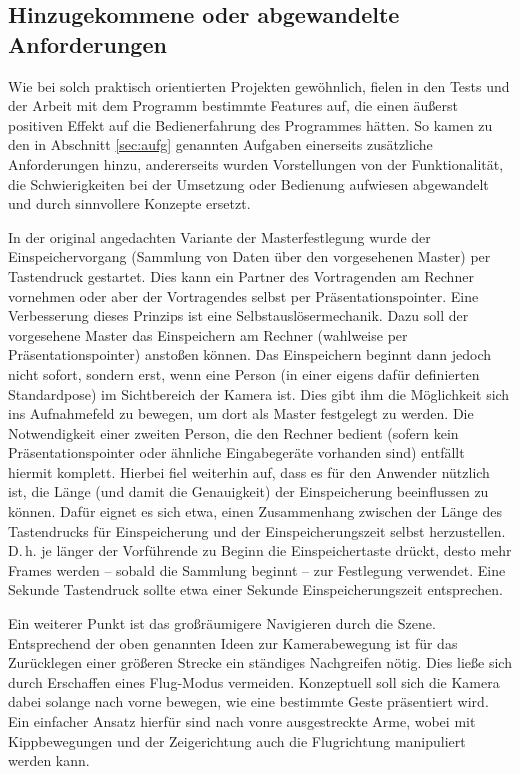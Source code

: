 \subsection{Hinzugekommene oder abgewandelte Anforderungen}
	Wie bei solch praktisch orientierten Projekten gewöhnlich, fielen in den Tests und der Arbeit mit dem Programm bestimmte Features auf, die einen äußerst positiven Effekt auf die Bedienerfahrung des Programmes hätten. So kamen zu den in Abschnitt \ref{sec:aufg} genannten Aufgaben einerseits zusätzliche Anforderungen hinzu, andererseits wurden Vorstellungen von der Funktionalität, die Schwierigkeiten bei der Umsetzung oder Bedienung aufwiesen abgewandelt und durch sinnvollere Konzepte ersetzt.\par
	In der original angedachten Variante der Masterfestlegung wurde der Einspeichervorgang (Sammlung von Daten über den vorgesehenen Master) per Tastendruck gestartet. Dies kann ein Partner des Vortragenden am Rechner vornehmen oder aber der Vortragendes selbst per Präsentationspointer. Eine Verbesserung dieses Prinzips ist eine Selbstauslösermechanik. Dazu soll der vorgesehene Master das Einspeichern am Rechner (wahlweise per Präsentationspointer) anstoßen können. Das Einspeichern beginnt dann jedoch nicht sofort, sondern erst, wenn eine Person (in einer eigens dafür definierten Standardpose) im Sichtbereich der Kamera ist. Dies gibt ihm die Möglichkeit sich ins Aufnahmefeld zu bewegen, um dort als Master festgelegt zu werden. Die Notwendigkeit einer zweiten Person, die den Rechner bedient (sofern kein Präsentationspointer oder ähnliche Eingabegeräte vorhanden sind) entfällt hiermit komplett. Hierbei fiel weiterhin auf, dass es für den Anwender nützlich ist, die Länge (und damit die Genauigkeit) der Einspeicherung beeinflussen zu können. Dafür eignet es sich etwa, einen Zusammenhang zwischen der Länge des Tastendrucks für Einspeicherung und der Einspeicherungszeit selbst herzustellen. D.\,h. je länger der Vorführende zu Beginn die Einspeichertaste drückt, desto mehr Frames werden -- sobald die Sammlung beginnt -- zur Festlegung verwendet. Eine Sekunde Tastendruck sollte etwa einer Sekunde Einspeicherungszeit entsprechen.\par 
	Ein weiterer Punkt ist das großräumigere Navigieren durch die Szene. Entsprechend der oben genannten Ideen zur Kamerabewegung ist für das Zurücklegen einer größeren Strecke ein ständiges Nachgreifen nötig. Dies ließe sich durch Erschaffen eines \glqq{}Flug-Modus\grqq{} vermeiden. Konzeptuell soll sich die Kamera dabei solange nach vorne bewegen, wie eine bestimmte Geste präsentiert wird. Ein einfacher Ansatz hierfür sind nach vonre ausgestreckte Arme, wobei mit Kippbewegungen und der Zeigerichtung auch die Flugrichtung manipuliert werden kann.\par
